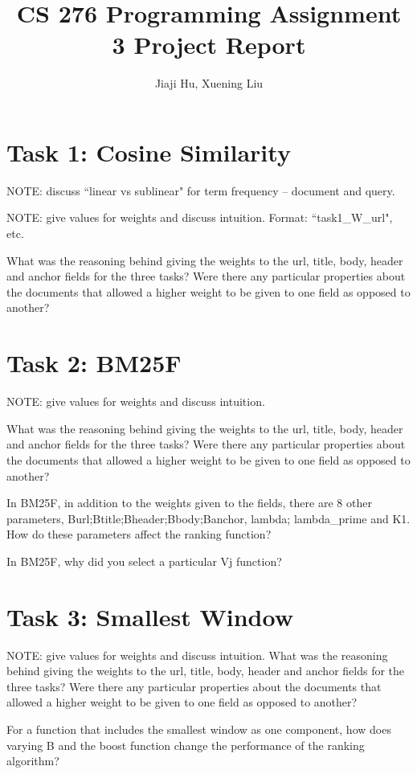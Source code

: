 \documentclass[10pt,twocolumn]{article}
\begin{document}
\title{CS 276 Programming Assignment 3 Project Report}
\author{Jiaji Hu, Xuening Liu}
\date{}
\maketitle

\section{Task 1: Cosine Similarity}
NOTE: discuss ``linear vs sublinear" for term frequency -- document and query.

NOTE: give values for weights and discuss intuition. Format: ``task1\_W\_url", etc.

What was the reasoning behind giving the weights to the url, title,
body, header and anchor fields for the three tasks? Were there any
particular properties about the documents that allowed a higher weight
to be given to one field as opposed to another?



\section{Task 2: BM25F}
NOTE: give values for weights and discuss intuition.

What was the reasoning behind giving the weights to the url, title,
body, header and anchor fields for the three tasks? Were there any
particular properties about the documents that allowed a higher weight
to be given to one field as opposed to another?

In BM25F, in addition to the weights given to the fields, there are
8 other parameters, Burl;Btitle;Bheader;Bbody;Banchor, lambda; lambda\_prime and K1.
How do these parameters affect the ranking function?

In BM25F, why did you select a particular Vj function?

\section{Task 3: Smallest Window}
NOTE: give values for weights and discuss intuition.
What was the reasoning behind giving the weights to the url, title,
body, header and anchor fields for the three tasks? Were there any
particular properties about the documents that allowed a higher weight
to be given to one field as opposed to another?

For a function that includes the smallest window as one component,
how does varying B and the boost function change the performance
of the ranking algorithm?
\end{document}
